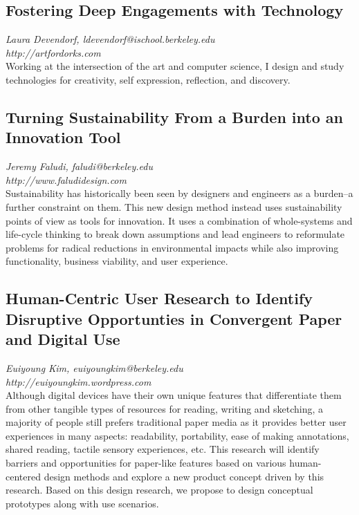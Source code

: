 \documentclass[foldmark,10pt,a4paper,notumble]{leaflet}
\begin{document}
\subsection{Fostering Deep Engagements with Technology}
\emph{Laura Devendorf, ldevendorf@ischool.berkeley.edu}\\
\emph{http://artfordorks.com}\\
Working at the intersection of the art and computer science, I design and study technologies for creativity, self expression, reflection, and discovery.

\subsection{Turning Sustainability From a Burden into an Innovation Tool}
\emph{Jeremy Faludi, faludi@berkeley.edu}\\
\emph{http://www.faludidesign.com}\\
Sustainability has historically been seen by designers and engineers as a burden--a further constraint on them.  This new design method instead uses sustainability points of view as tools for innovation.  It uses a combination of whole-systems and life-cycle thinking to break down assumptions and lead engineers to reformulate problems for radical reductions in environmental impacts while also improving functionality, business viability, and user experience.

\subsection{Human-Centric User Research to Identify Disruptive Opportunties in Convergent Paper and Digital Use}
\emph{Euiyoung Kim, euiyoungkim@berkeley.edu}\\
\emph{http://euiyoungkim.wordpress.com}\\
Although digital devices have their own unique features that differentiate them from other
tangible types of resources for reading, writing and sketching, a majority of people still prefers traditional
paper media as it provides better user experiences in many aspects: readability, portability, ease of
making annotations, shared reading, tactile sensory experiences, etc. This research will identify
barriers and opportunities for paper-like features based on various human-centered design methods and
explore a new product concept driven by this research. Based on this design research, we propose to
design conceptual prototypes along with use scenarios. 
\end{document}
